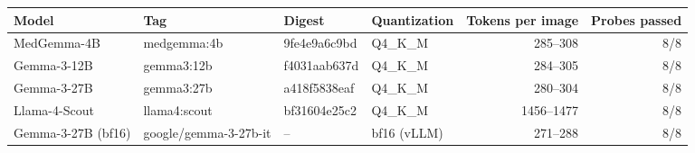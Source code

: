 \begin{tabular}{llllrr}
\toprule
Model & Tag & Digest & Quantization & Tokens per image & Probes passed \\
\midrule
MedGemma-4B & medgemma:4b & 9fe4e9a6c9bd & Q4\_K\_M & 285--308 & 8/8 \\
Gemma-3-12B & gemma3:12b & f4031aab637d & Q4\_K\_M & 284--305 & 8/8 \\
Gemma-3-27B & gemma3:27b & a418f5838eaf & Q4\_K\_M & 280--304 & 8/8 \\
Llama-4-Scout & llama4:scout & bf31604e25c2 & Q4\_K\_M & 1456--1477 & 8/8 \\
Gemma-3-27B (bf16) & google/gemma-3-27b-it & -- & bf16 (vLLM) & 271--288 & 8/8 \\
\bottomrule
\end{tabular}
